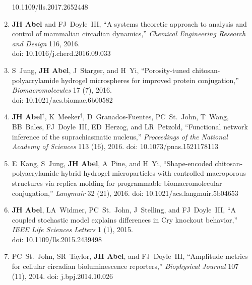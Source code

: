 \documentclass[line,10pt]{res}
\begin{document}
\begin{resume}
\begin{enumerate}
    10.1109/lls.2017.2652448%
    \item \textbf{JH Abel} and FJ~Doyle~III, ``A systems theoretic approach to analysis and control of mammalian circadian dynamics,'' \textit{Chemical Engineering Research and Design} 116, 2016. \\doi: %
    10.1016/j.cherd.2016.09.033%
    \item S~Jung, \textbf{JH Abel}, J~Starger, and H~Yi, ``Porosity-tuned chitosan-polyacrylamide hydrogel microspheres for improved protein conjugation,'' \textit{Biomacromolecules} 17 (7), 2016. \\doi:%
    10.1021/acs.biomac.6b00582%
    \item \textbf{JH Abel}$^\dagger$, K~Meeker$^\dagger$, D~Granados-Fuentes, PC~St.~John, T~Wang, BB~Bales, FJ~Doyle~III, ED~Herzog, and LR~Petzold,
        ``Functional network inference of the suprachiasmatic nucleus,''  \textit{Proceedings of the National Academy of Sciences} 113 (16), 2016. doi:  %
10.1073/pnas.1521178113%
    \item E~Kang, S~Jung, \textbf{JH Abel}, A~Pine, and H~Yi, ``Shape-encoded chitosan-polyacrylamide hybrid hydrogel microparticles with controlled macroporous structures via replica molding for programmable biomacromolecular conjugation,'' \textit{Langmuir} 32 (21), 2016. doi: %
    10.1021/acs.langmuir.5b04653%
    \item \textbf{JH Abel}, LA~Widmer, PC~St.~John, J~Stelling, and FJ~Doyle~III,
        ``A coupled stochastic model explains differences in Cry knockout behavior,'' \textit{IEEE Life Sciences Letters} 1 (1), 2015. \\doi: %
10.1109/lls.2015.2439498%
    \item PC~St.~John, SR~Taylor, \textbf{JH Abel}, and FJ~Doyle~III, ``Amplitude metrics for cellular circadian bioluminescence reporters,'' \textit{Biophysical Journal} 107 (11), 2014. doi: %
    j.bpj.2014.10.026%
\end{enumerate}


\end{resume}
\end{document}
